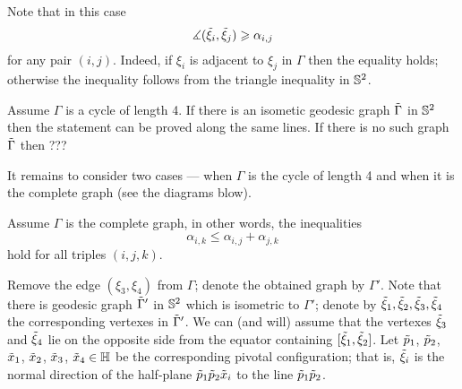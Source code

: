 Note that in this case
\[\measuredangle(\~\xi_i,\~\xi_j)\ge \alpha_{i,j}\]
for any pair $(i,j)$.
Indeed, if $\xi_i$ is adjacent to $\xi_j$ in $\Gamma$ then the equality holds;
otherwise the inequality follows from the triangle inequality in $\SS^2$.

\hide
\begin{wrapfigure}{r}{14 mm}
\end{wrapfigure}
\unhide

Assume $\Gamma$ is a cycle of length 4.
If there is an isometic geodesic graph $\~\Gamma$ in $\SS^2$ then the statement can be proved along the same lines.
If there is no such graph $\~\Gamma$ then ???

\hide
\begin{wrapfigure}{r}{14 mm}
\end{wrapfigure}
\unhide

It remains to consider two cases --- when $\Gamma$ is the cycle of length 4 and when it is the complete graph (see the diagrams blow). 

Assume $\Gamma$ is the complete graph, in other words, the inequalities 
\[\alpha_{i,k}\le \alpha_{i,j}+\alpha_{j,k}\]
hold for all triples $(i,j,k)$.

Remove the edge $(\xi_3,\xi_4)$ from $\Gamma$;
denote the obtained graph by $\Gamma'$.
Note that there is geodesic graph $\~\Gamma'$ in $\SS^2$ which is isometric to $\Gamma'$;
denote by $\~\xi_1,\~\xi_2,\~\xi_3,\~\xi_4$ the corresponding vertexes in $\~\Gamma'$.
We can (and will) assume that the vertexes $\~\xi_3$ and $\~\xi_4$ lie on the opposite side from the equator containing $[\~\xi_1,\~\xi_2]$.
Let $\~p_1$, $\~p_2$, $\~x_1$, $\~x_2$, $\~x_3$, $\~x_4\in \HH$ be the corresponding pivotal configuration;
that is, $\~\xi_i$ is the normal direction of the half-plane $\~p_1\~p_2\~x_i$ to the line $\~p_1\~p_2$.

